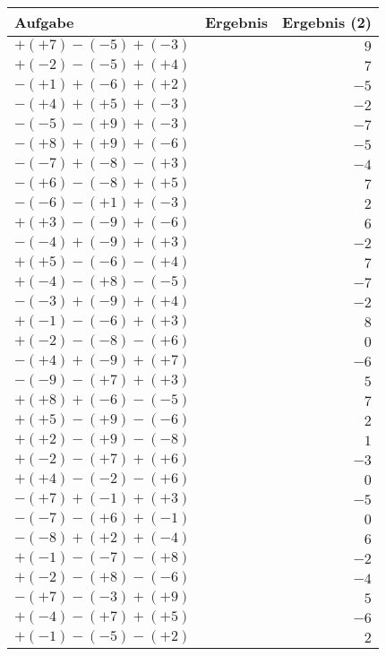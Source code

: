 \documentclass[a4paper,12pt]{scrartcl}
\begin{document}
\begin{center}
\begin{tabular}{|l|l|r|}
\hline
Aufgabe & Ergebnis\hspace{100} & Ergebnis (2)\\ \hline\hline
$+(+7)-(-5)+(-3)$ & & $9$\\ \hline
$+(-2)-(-5)+(+4)$ & & $7$\\ \hline
$-(+1)+(-6)+(+2)$ & & $-5$\\ \hline
$-(+4)+(+5)+(-3)$ & & $-2$\\ \hline
$-(-5)-(+9)+(-3)$ & & $-7$\\ \hline
$-(+8)+(+9)+(-6)$ & & $-5$\\ \hline
$-(-7)+(-8)-(+3)$ & & $-4$\\ \hline
$-(+6)-(-8)+(+5)$ & & $7$\\ \hline
$-(-6)-(+1)+(-3)$ & & $2$\\ \hline
$+(+3)-(-9)+(-6)$ & & $6$\\ \hline
$-(-4)+(-9)+(+3)$ & & $-2$\\ \hline
$+(+5)-(-6)-(+4)$ & & $7$\\ \hline
$+(-4)-(+8)-(-5)$ & & $-7$\\ \hline
$-(-3)+(-9)+(+4)$ & & $-2$\\ \hline
$+(-1)-(-6)+(+3)$ & & $8$\\ \hline
$+(-2)-(-8)-(+6)$ & & $0$\\ \hline
$-(+4)+(-9)+(+7)$ & & $-6$\\ \hline
$-(-9)-(+7)+(+3)$ & & $5$\\ \hline
$+(+8)+(-6)-(-5)$ & & $7$\\ \hline
$+(+5)-(+9)-(-6)$ & & $2$\\ \hline
$+(+2)-(+9)-(-8)$ & & $1$\\ \hline
$+(-2)-(+7)+(+6)$ & & $-3$\\ \hline
$+(+4)-(-2)-(+6)$ & & $0$\\ \hline
$-(+7)+(-1)+(+3)$ & & $-5$\\ \hline
$-(-7)-(+6)+(-1)$ & & $0$\\ \hline
$-(-8)+(+2)+(-4)$ & & $6$\\ \hline
$+(-1)-(-7)-(+8)$ & & $-2$\\ \hline
$+(-2)-(+8)-(-6)$ & & $-4$\\ \hline
$-(+7)-(-3)+(+9)$ & & $5$\\ \hline
$+(-4)-(+7)+(+5)$ & & $-6$\\ \hline
$+(-1)-(-5)-(+2)$ & & $2$\\ \hline

\end{tabular}
\end{center}
\end{document}
